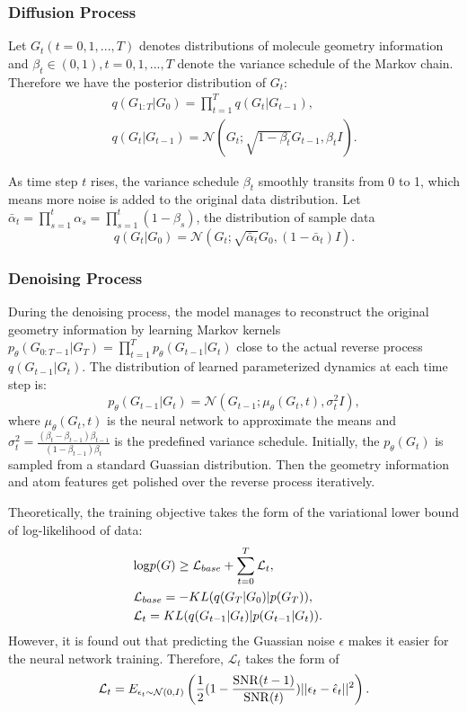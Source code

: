 \documentclass[letterpaper]{article} %
\begin{document}
\subsubsection{Diffusion Process}
Let $G_t (t=0, 1, ..., T)$ denotes distributions of molecule geometry information and $\beta_t \in (0, 1), t=0, 1, ..., T$ denote the variance schedule of the Markov chain. Therefore we have the posterior distribution of $G_t$:
\begin{eqnarray}
  &q(G_{1:T} | G_0) = \prod^T_{t=1} q(G_t | G_{t-1}), &\\ 
  &q(G_t | G_{t-1}) = \mathcal{N}(G_t; \sqrt{1-\beta_t}G_{t-1}, \beta_t I).&
\end{eqnarray}

As time step $t$ rises, the variance schedule $\beta_t$ smoothly transits from 0 to 1, which means more noise is added to the original data distribution. Let $\bar{\alpha}_t = \prod^t_{s=1} \alpha_s = \prod^t_{s=1}(1-\beta_s)$, the distribution of sample data
\begin{equation}
    q(G_t|G_0) = \mathcal{N}(G_t; \sqrt{\bar{\alpha}_t} G_0, (1 - \bar{\alpha}_t) I).
\end{equation} 

\subsubsection{Denoising Process}
During the denoising process, the model manages to reconstruct the original geometry information by learning Markov kernels $p_\theta(G_{0:T-1}| G_{T}) = \prod^T_{t=1} p_\theta(G_{t-1} | G_t)$ close to the actual reverse process $q(G_{t-1} | G_t)$. The distribution of learned parameterized dynamics at each time step is: 
\begin{equation}
  p_\theta(G_{t-1} | G_t) = \mathcal{N}(G_{t-1}; \mu_\theta(G_t, t), \sigma_t^2 I),
\end{equation}
where $\mu_\theta(G_t, t)$ is the neural network to approximate the means and $\sigma^2_t = \frac{(\beta_t - \beta_{t-1})\beta_{t-1}}{(1 - \beta_{t-1}) \beta_t}$ is the predefined variance schedule. Initially, the $p_\theta(G_t)$ is sampled from a standard Guassian distribution. Then the geometry information and atom features get polished over the reverse process iteratively. 

Theoretically, the training objective takes the form of the variational lower bound of log-likelihood of data:
\begin{eqnarray}
    &{\rm log}p(G) \geq \mathcal{L}_{base} + \sum_{t=0}^T \mathcal{L}_t,& \\
    &\mathcal{L}_{base} = -KL(q(G_T|G_0)|p(G_T)),& \\
    &\mathcal{L}_t = KL(q(G_{t-1}|G_t)|p(G_{t-1}|G_t)). &
\end{eqnarray}
However, it is found out that predicting the Guassian noise $\epsilon$ makes it easier for the neural network training. Therefore, $\mathcal{L}_t$ \cite{vaediff_21_kingma} takes the form of
\begin{equation}
    \mathcal{L}_t = E_{\epsilon_t \sim \mathcal{N}(0, I)}\left(\frac{1}{2}(1- \frac{{\rm SNR}(t-1)}{{\rm SNR}(t)})||\epsilon_t - \hat{\epsilon}_t||^2\right).
\end{equation}
\end{document}
